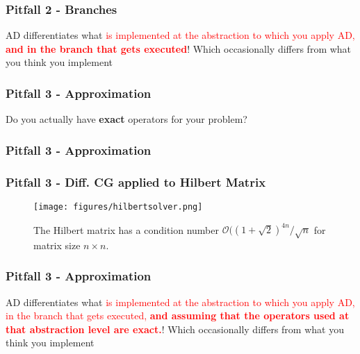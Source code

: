 \documentclass[11pt]{beamer}
\begin{document}
\begin{frame}
	\frametitle{Pitfall 2 - Branches}

	AD differentiates what \textcolor{red}{is implemented at the abstraction to which you apply AD, \textbf{and in the branch that gets executed}}! Which occasionally differs from what you think you implement
\end{frame}

\begin{frame}
	\frametitle{Pitfall 3 - Approximation}

	\begin{center}
		Do you actually have \textbf{exact} operators for your problem?
	\end{center}
\end{frame}

\begin{frame}
	\frametitle{Pitfall 3 - Approximation}

	\begin{figure}
	\end{figure}

\end{frame}

\begin{frame}
	\frametitle{Pitfall 3 - Diff. CG applied to Hilbert Matrix}

	\begin{figure}
		\texttt{[image: figures/hilbertsolver.png]}

		\caption{The Hilbert matrix has a condition number $\mathcal{O}((1+\sqrt{2})^{4n} / \sqrt{n}$ for matrix size $n\times n$. \cite{diffcg}}
	\end{figure}
\end{frame}

\begin{frame}
	\frametitle{Pitfall 3 - Approximation}

	AD differentiates what \textcolor{red}{is implemented at the abstraction to which you apply AD, in the branch that gets executed, \textbf{and assuming that the operators used at that abstraction level are exact.}}! Which occasionally differs from what you think you implement
\end{frame}
\end{document}
